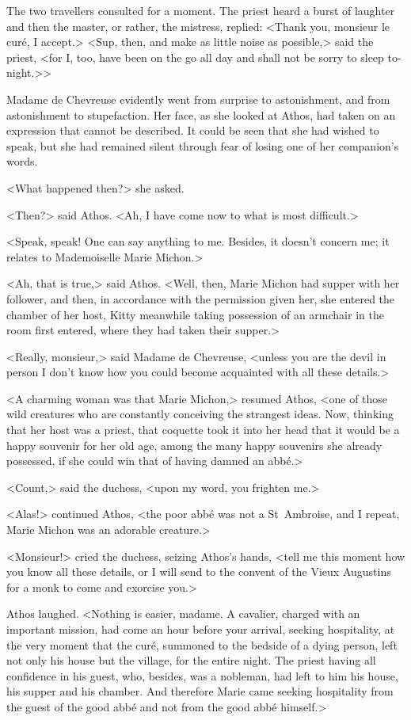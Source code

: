 The two travellers consulted for a moment. The priest heard a burst of laughter and then the master, or rather, the mistress, replied: <Thank you, monsieur le curé, I accept.> <Sup, then, and make as little noise as possible,> said the priest, <for I, too, have been on the go all day and shall not be sorry to sleep to-night.>>

Madame de Chevreuse evidently went from surprise to astonishment, and from astonishment to stupefaction. Her face, as she looked at Athos, had taken on an expression that cannot be described. It could be seen that she had wished to speak, but she had remained silent through fear of losing one of her companion's words.

<What happened then?> she asked.

<Then?> said Athos. <Ah, I have come now to what is most difficult.>

<Speak, speak! One can say anything to me. Besides, it doesn't concern me; it relates to Mademoiselle Marie Michon.>

<Ah, that is true,> said Athos. <Well, then, Marie Michon had supper with her follower, and then, in accordance with the permission given her, she entered the chamber of her host, Kitty meanwhile taking possession of an armchair in the room first entered, where they had taken their supper.>

<Really, monsieur,> said Madame de Chevreuse, <unless you are the devil in person I don't know how you could become acquainted with all these details.>

<A charming woman was that Marie Michon,> resumed Athos, <one of those wild creatures who are constantly conceiving the strangest ideas. Now, thinking that her host was a priest, that coquette took it into her head that it would be a happy souvenir for her old age, among the many happy souvenirs she already possessed, if she could win that of having damned an abbé.>

<Count,> said the duchess, <upon my word, you frighten me.>

<Alas!> continued Athos, <the poor abbé was not a St~Ambroise, and I repeat, Marie Michon was an adorable creature.>

<Monsieur!> cried the duchess, seizing Athos's hands, <tell me this moment how you know all these details, or I will send to the convent of the Vieux Augustins for a monk to come and exorcise you.>

Athos laughed. <Nothing is easier, madame. A cavalier, charged with an important mission, had come an hour before your arrival, seeking hospitality, at the very moment that the curé, summoned to the bedside of a dying person, left not only his house but the village, for the entire night. The priest having all confidence in his guest, who, besides, was a nobleman, had left to him his house, his supper and his chamber. And therefore Marie came seeking hospitality from the guest of the good abbé and not from the good abbé himself.>

